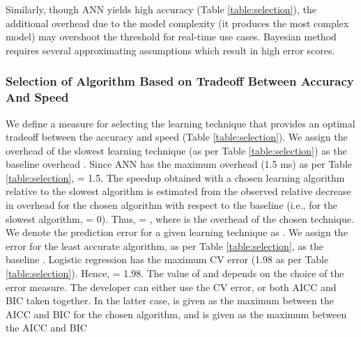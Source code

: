 \documentclass[conference]{IEEEtran}
\begin{document}
   Similarly, though ANN yields high accuracy (Table \ref{table:selection}), the additional overhead due to the model complexity (it produces the most complex model) may overshoot the threshold for real-time use cases. Bayesian method requires several approximating assumptions which result in high error scores.   \subsubsection{Selection of Algorithm Based on Tradeoff Between Accuracy And Speed}\label{sec:criteria}

 \begin{table}[!htb]
\caption{Evaluation of the Accuracy-Speed Tradeoff} \label{table:choice}
\end{table}
  We define a measure \emph{} for selecting the learning technique that provides an optimal tradeoff between the accuracy and speed (Table \ref{table:selection}).
   We assign the overhead of the slowest learning technique (as per Table \ref{table:selection}) as the baseline overhead . Since ANN has the maximum overhead (1.5 ms) as per Table \ref{table:selection},
   = 1.5.
 The speedup  obtained with a chosen learning algorithm relative to the slowest
  algorithm is estimated from the observed relative decrease in overhead for the chosen algorithm with respect to the baseline  (i.e., for the slowest algorithm, = 0).
   Thus,
    = , where  is the overhead of the chosen
  technique.
     We denote the prediction error for a given learning technique as . We assign
   the error for the least accurate algorithm, as per Table \ref{table:selection}, as the baseline
   . Logistic regression has the maximum CV error (1.98 as per Table \ref{table:selection}).
    Hence,  = 1.98. The value of  and  depends on the choice of
   the error measure.  The developer can either use the CV error, or both AICC and
   BIC taken together. In the latter case,  is given as the maximum between
   the AICC and BIC for the chosen algorithm, and  is given as the maximum between the AICC and BIC
\end{document}
